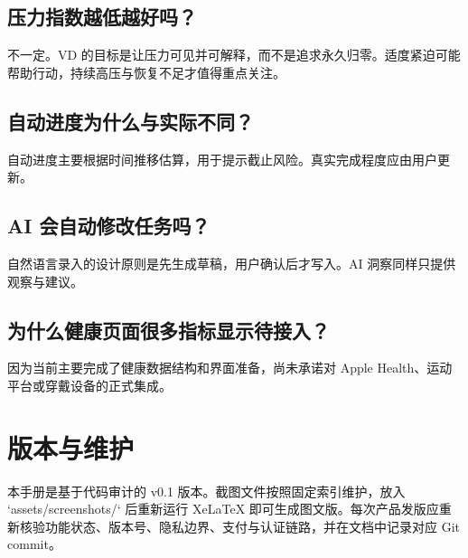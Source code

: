\documentclass[11pt,a4paper,openany]{ctexrep}
\begin{document}
\section{压力指数越低越好吗？}
不一定。VD 的目标是让压力可见并可解释，而不是追求永久归零。适度紧迫可能帮助行动，持续高压与恢复不足才值得重点关注。

\section{自动进度为什么与实际不同？}
自动进度主要根据时间推移估算，用于提示截止风险。真实完成程度应由用户更新。

\section{AI 会自动修改任务吗？}
自然语言录入的设计原则是先生成草稿，用户确认后才写入。AI 洞察同样只提供观察与建议。

\section{为什么健康页面很多指标显示待接入？}
因为当前主要完成了健康数据结构和界面准备，尚未承诺对 Apple Health、运动平台或穿戴设备的正式集成。

\chapter{版本与维护}

本手册是基于代码审计的 v0.1 版本。截图文件按照固定索引维护，放入 `assets/screenshots/` 后重新运行 XeLaTeX 即可生成图文版。每次产品发版应重新核验功能状态、版本号、隐私边界、支付与认证链路，并在文档中记录对应 Git commit。
\end{document}
